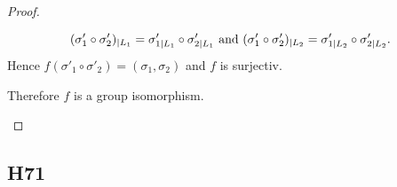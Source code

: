 \begin{proof}
\begin{itemize}
\begin{itemize}
			\begin{align*}
				(\sigma'_1 \circ \sigma'_2)_{\mid L_1} = \sigma'_{1\mid L_1} \circ \sigma'_{2\mid L_1} \text{ and }
				(\sigma'_1 \circ \sigma'_2)_{\mid L_2} = \sigma'_{1\mid L_2} \circ \sigma'_{2\mid L_2}.
			\end{align*}
			Hence $f(\sigma'_1 \circ \sigma'_2) = (\sigma_1, \sigma_2)$ and $f$ is surjectiv. 
		\end{itemize}
	Therefore $f$ is a group isomorphism.
	\end{itemize}
\end{proof}

\subsection{H71}
